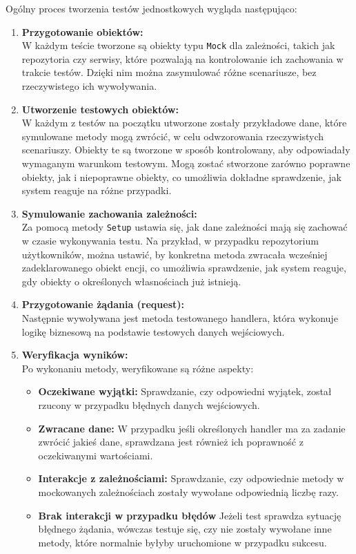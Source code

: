 \documentclass[twoside]{projektInzynierskiMS1}
\begin{document}
\newpage

\noindent
Ogólny proces tworzenia testów jednostkowych wygląda następująco:

\begin{enumerate}
    \item \textbf{Przygotowanie obiektów:}\\
    W każdym teście tworzone są obiekty typu \texttt{Mock} dla zależności, takich jak repozytoria czy serwisy, które pozwalają na kontrolowanie ich zachowania w trakcie testów. Dzięki nim można zasymulować różne scenariusze, bez rzeczywistego ich wywoływania.

    \item \textbf{Utworzenie testowych obiektów:}\\
    W każdym z testów na początku utworzone zostały przykładowe dane, które symulowane metody mogą zwrócić, w celu odwzorowania rzeczywistych scenariuszy. Obiekty te są tworzone w sposób kontrolowany, aby odpowiadały wymaganym warunkom testowym. Mogą zostać stworzone zarówno poprawne obiekty, jak i niepoprawne obiekty, co umożliwia dokładne sprawdzenie, jak system reaguje na różne przypadki.

    \item \textbf{Symulowanie zachowania zależności:}\\
    Za pomocą metody \texttt{Setup} ustawia się, jak dane zależności mają się zachować w czasie wykonywania testu. Na przykład, w przypadku repozytorium użytkowników, można ustawić, by konkretna metoda zwracała wcześniej zadeklarowanego obiekt encji, co umożliwia sprawdzenie, jak system reaguje, gdy obiekty o określonych własnościach już istnieją.

    \item \textbf{Przygotowanie żądania (request):}\\
    Następnie wywoływana jest metoda testowanego handlera, która wykonuje logikę biznesową na podstawie testowych danych wejściowych.

    \item \textbf{Weryfikacja wyników:} \\
    Po wykonaniu metody, weryfikowane są różne aspekty:

    \begin{itemize}
        \item \textbf{Oczekiwane wyjątki:} Sprawdzanie, czy odpowiedni wyjątek, został rzucony w przypadku błędnych danych wejściowych.
        \item \textbf{Zwracane dane:} W przypadku jeśli określonych handler ma za zadanie zwrócić jakieś dane, sprawdzana jest również ich poprawność z oczekiwanymi wartościami.
        \item \textbf{Interakcje z zależnościami:} Sprawdzanie, czy odpowiednie metody w mockowanych zależnościach zostały wywołane odpowiednią liczbę razy.
        \item \textbf{Brak interakcji w przypadku błędów} Jeżeli test sprawdza sytuację błędnego żądania, wówczas testuje się, czy nie zostały wywołane inne metody, które normalnie byłyby uruchomione w przypadku sukcesu.
    \end{itemize}

\end{enumerate}
\end{document}
